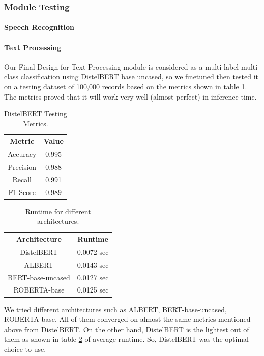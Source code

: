 \subsubsection{Module Testing}

\paragraph{Speech Recognition}

\paragraph{Text Processing}
Our Final Design for Text Processing module is considered as a multi-label multi-class classification using DistelBERT base uncased, so we finetuned then tested it on  a testing dataset of 100,000 records based on the metrics shown in table \ref{tab:text_metrics}. The metrics proved that it will work very well (almost perfect) in inference time.

\begin{table}[ht]
\centering
\caption{DistelBERT Testing Metrics.}
\begin{tabular}[t]{| c | c |}
\hline
Metric & Value \\
\hline
Accuracy & 0.995 \\
\hline
Precision & 0.988 \\
\hline
Recall & 0.991\\
\hline
F1-Score & 0.989 \\
\hline
\end{tabular}
\label{tab:text_metrics}
\end{table}

\begin{table}[ht]
\centering
\caption{Runtime for different architectures.}
\begin{tabular}[t]{| c | c |}
\hline
Architecture & Runtime \\
\hline
DistelBERT & 0.0072 sec \\
\hline
ALBERT & 0.0143 sec \\
\hline
BERT-base-uncased & 0.0127 sec \\
\hline
ROBERTA-base & 0.0125 sec \\
\hline
\end{tabular}
\label{tab:text_runtime}
\end{table}

We tried different architectures such as ALBERT, BERT-base-uncased, ROBERTA-base. All of them converged on almost the same metrics mentioned above from DistelBERT. On the other hand, DistelBERT is the lightest out of them as shown in table \ref{tab:text_runtime} of average runtime. So, DistelBERT was the optimal choice to use.

